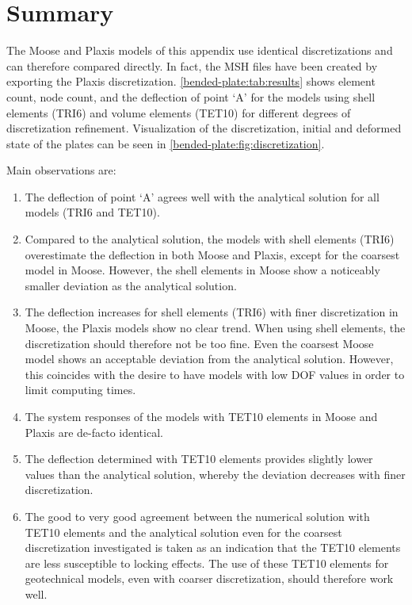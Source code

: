 \section{Summary}
\label{bended-plate:sec:summary}

The Moose and Plaxis models of this appendix use identical discretizations and
can therefore compared directly. In fact, the MSH files have been created by
exporting the Plaxis discretization. \autoref{bended-plate:tab:results} shows
element count, node count, and the deflection of point ‘A’ for the models using
shell elements (TRI6) and volume elements (TET10) for different degrees of
discretization refinement. Visualization of the discretization, initial and
deformed state of the plates can be seen in
\autoref{bended-plate:fig:discretization}.

Main observations are:

\begin{enumerate}
    \item The deflection of point ‘A’ agrees well with the analytical solution for all
          models (TRI6 and TET10).
    \item Compared to the analytical solution, the models with shell elements (TRI6)
          overestimate the deflection in both Moose and Plaxis, except for the coarsest
          model in Moose. However, the shell elements in Moose show a noticeably smaller
          deviation as the analytical solution.
    \item The deflection increases for shell elements (TRI6) with finer discretization in
          Moose, the Plaxis models show no clear trend. When using shell elements, the
          discretization should therefore not be too fine. Even the coarsest Moose model
          shows an acceptable deviation from the analytical solution. However, this
          coincides with the desire to have models with low DOF values in order to limit
          computing times.
    \item The system responses of the models with TET10 elements in Moose and Plaxis are
          de-facto identical.
    \item The deflection determined with TET10 elements provides slightly lower values
          than the analytical solution, whereby the deviation decreases with finer
          discretization.
    \item The good to very good agreement between the numerical solution with TET10
          elements and the analytical solution even for the coarsest discretization
          investigated is taken as an indication that the TET10 elements are less
          susceptible to locking effects. The use of these TET10 elements for
          geotechnical models, even with coarser discretization, should therefore work
          well.
\end{enumerate}


